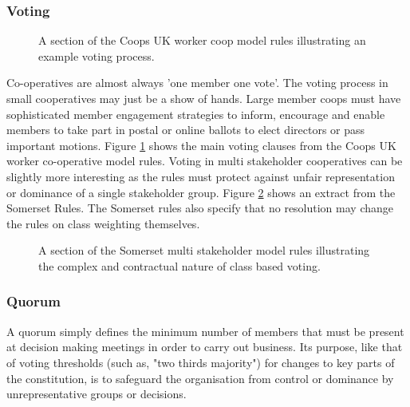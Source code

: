 \subsubsection{Voting}
\begin{figure}
\centering
{}
\decoRule
\caption[Worker Coop Voting Process]{A section of the Coops UK worker coop model rules illustrating an example voting process.}
\label{fig:WorkerRulesVoting}
\end{figure} 
Co-operatives are almost always 'one member one vote'. The voting process in small cooperatives may just be a show of hands. Large member coops must have sophisticated member engagement strategies to inform, encourage and enable members to take part in postal or online ballots to elect directors or pass important motions. Figure \ref{fig:WorkerRulesVoting} shows the main voting clauses from the Coops UK worker co-operative model rules. Voting in multi stakeholder cooperatives can be slightly more interesting as the rules must protect against unfair representation or dominance of a single stakeholder group. Figure \ref{fig:SomersetVoting} shows an extract from the Somerset Rules. The Somerset rules also specify that no resolution may change the rules on class weighting themselves. 
\begin{figure}
\centering
{}
\decoRule
\caption[Somerset Rules for Class Based Voting]{A section of the Somerset multi stakeholder model rules illustrating the complex and contractual nature of class based voting.}
\label{fig:SomersetVoting}
\end{figure} 

\subsubsection{Quorum}
A quorum simply defines the minimum number of members that must be present at decision making meetings in order to carry out business. Its purpose, like that of voting thresholds (such as, "two thirds majority") for changes to key parts of the constitution, is to safeguard the organisation from control or dominance by unrepresentative groups or decisions.

